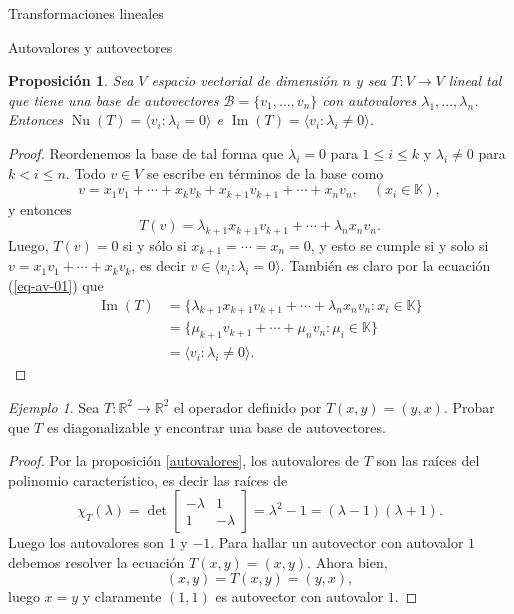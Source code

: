 \documentclass[a4paper,12pt,twoside,spanish,reqno]{amsbook}
\numberwithin{equation}{section}
\newtheorem{proposicion}[teorema]{Proposici\'on}
\theoremstyle{definition}
\theoremstyle{remark}
\newtheorem*{ejemplo*}{Ejemplo}
\newcommand{\img}{\operatorname{Im}}
\newcommand{\nuc}{\operatorname{Nu}}
\newcommand{\R}{\mathbb R}
\newcommand{\K}{\mathbb K}
\begin{document}
\begin{chapter}{Transformaciones lineales}
\begin{section}{Autovalores y autovectores}
        \begin{proposicion} Sea $V$ espacio vectorial de dimensión $n$ y sea $T: V \to V$ lineal tal que tiene una base de autovectores $\mathcal{B} = \{v_1,\ldots,v_n \}$  con autovalores $\lambda_1,\ldots,\lambda_n$. Entonces $\nuc(T)=\langle v_i: \lambda_i =0 \rangle$ e  $\img(T)=\langle v_i: \lambda_i \not=0 \rangle$.			
        \end{proposicion}
        \begin{proof} Reordenemos la base de tal forma que  $\lambda_i =0$ para $1 \le i \le k$ y $\lambda_i \ne 0$ para $k < i \le n$. 
        Todo $v \in V$ se escribe en términos de la base como 
        $$
        v = x_1v_1 + \cdots+ x_k v_k+ x_{k+1} v_{k+1}+\cdots+ x_n v_n,\quad (x_i \in \K),
        $$
        y entonces
        \begin{equation}\label{eq-av-01}
            T(v) =  \lambda_{k+1}x_{k+1} v_{k+1}+\cdots+ \lambda_nx_n v_n.
        \end{equation}
        Luego, $T(v) =0$ si y sólo si $x_{k+1} = \cdots = x_n=0$, y esto se cumple si y solo si $v =  x_1v_1 + \cdots+ x_k v_k$,  es decir $v \in \langle v_i: \lambda_i =0 \rangle$. 
        También es claro por la ecuación (\ref{eq-av-01}) que 
        \begin{align*}
            \img(T) &= \{\lambda_{k+1}x_{k+1} v_{k+1}+\cdots+ \lambda_nx_n v_n: x_i \in \K \} \\
            &=\{\mu_{k+1} v_{k+1}+\cdots+ \mu_n v_n: \mu_i \in \K \}\\
            &= \langle v_i: \lambda_i \not=0 \rangle.
        \end{align*}
        \end{proof}
        
        \begin{ejemplo*}
            Sea $T:\R^2 \longrightarrow \R^2$ el operador definido por $T(x,y)=(y,x)$. Probar que $T$ es diagonalizable y encontrar una base de autovectores. 
        \end{ejemplo*}
        \begin{proof}
            Por la proposición \ref{autovalores}, los autovalores de $T$  son las raíces del polinomio característico,  es decir las raíces de 
            $$
            \chi_T(\lambda)= \det\left[\begin{matrix}
            -\lambda& 1 \\ 1 & -\lambda
            \end{matrix} \right]= \lambda^2 -1  =(\lambda -1)(\lambda +1). 
            $$
            Luego los autovalores son $1$ y $-1$. Para hallar un autovector con autovalor $1$ debemos resolver la ecuación $T(x,y) = (x,y)$. Ahora bien, 
            $$
            (x,y) = T(x,y) = (y,x),
            $$
            luego $x =y$ y claramente $(1,1)$ es autovector con autovalor $1$.
            

\end{proof}
\end{section}
\end{chapter}
\end{document}
